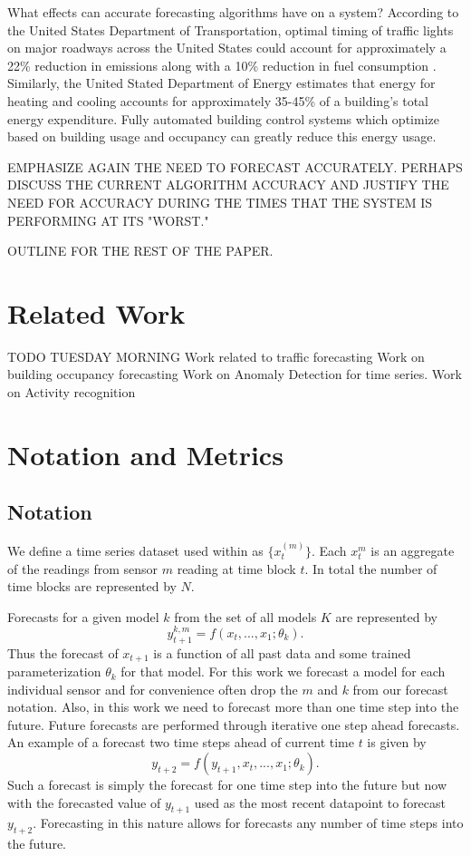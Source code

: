 \documentclass{sig-alternate}
\begin{document}
What effects can accurate forecasting algorithms have on a system?  According to the United States Department of Transportation, optimal timing of traffic lights on major roadways across the United States could account for approximately a 22\% reduction in emissions along with a 10\% reduction in fuel consumption \cite{DOT2007}.  Similarly, the United Stated Department of Energy \cite{DOE2010} estimates that energy for heating and cooling accounts for approximately 35-45\% of a building's total energy expenditure.  Fully automated building control systems which optimize based on building usage and occupancy can greatly reduce this energy usage.

EMPHASIZE AGAIN THE NEED TO FORECAST ACCURATELY.  PERHAPS DISCUSS THE CURRENT ALGORITHM ACCURACY AND JUSTIFY THE NEED FOR ACCURACY DURING THE TIMES THAT THE SYSTEM IS PERFORMING AT ITS "WORST."

OUTLINE FOR THE REST OF THE PAPER.


\section{Related Work}
TODO TUESDAY MORNING
Work related to traffic forecasting
Work on building occupancy forecasting
Work on Anomaly Detection for time series.
Work on Activity recognition

\section{Notation and Metrics}
\subsection{Notation}
We define a time series dataset used within as  $\{x_{t}^{(m)}\}$.  Each $x_{t}^{m}$ is an aggregate of the readings from sensor $m$ reading at time block $t$.  In total the number of time blocks are represented by $N$.

Forecasts for a given model $k$ from the set of all models $K$ are represented by 
\begin{equation}
y_{t + 1}^{k, m} = f(x_{t}, ..., x_{1}; \theta_{k}).
\end{equation}
\noindent
Thus the forecast of $x_{t + 1}$ is a function of all past data and some trained parameterization $\theta_{k}$ for that model.  For this work we forecast a model for each individual sensor and for convenience often drop the $m$ and $k$ from our forecast notation.  Also, in this work we need to forecast more than one time step into the future.  Future forecasts are performed through iterative one step ahead forecasts.    An example of a forecast two time steps ahead of current time $t$ is given by 
\begin{equation}
y_{t + 2} = f(y_{t + 1}, x_{t}, ..., x_{1}; \theta_{k}).
\end{equation}
\noindent
Such a forecast is simply the forecast for one time step into the future but now with the forecasted value of $y_{t + 1}$ used as the most recent datapoint to forecast $y_{t + 2}$.  Forecasting in this nature allows for forecasts any number of time steps into the future.
\end{document}

